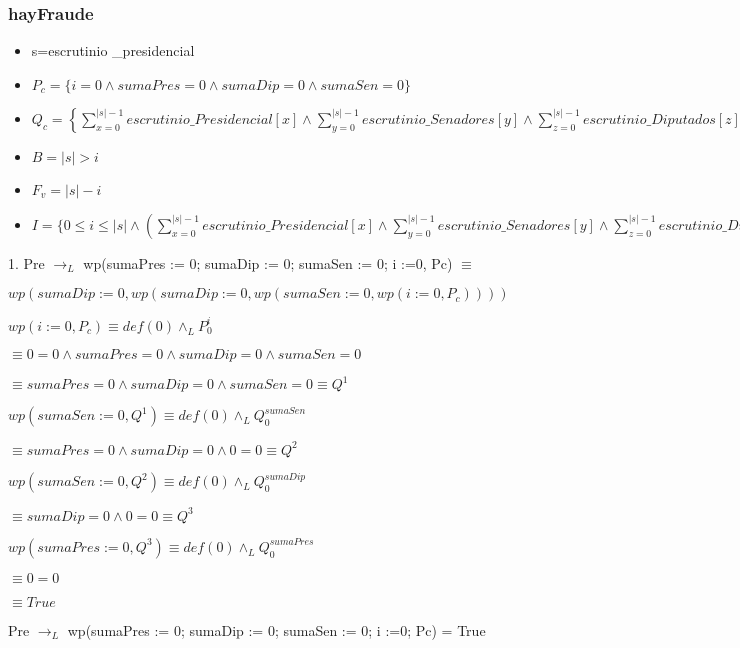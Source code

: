 \documentclass[10pt,a4paper]{article}
\begin{document}
\subsubsection{hayFraude}
\begin{itemize}
	\item s=escrutinio \_presidencial
    \item $P_c = \{ i=0 \land sumaPres=0 \land sumaDip=0 \land sumaSen=0 \}$
	\item $Q_c = \left\{ \sum\limits_{x=0}^{|s| - 1} escrutinio\_Presidencial[x] \land \sum\limits_{y=0}^{|s| - 1} escrutinio\_Senadores[y] \land \sum\limits_{z=0}^{|s| - 1} escrutinio\_Diputados[z] \right\}$
	\item $B = |s| > i$
	\item $F_v = |s| - i$
	\item $I = \{0 \leq i \leq |s| \land (\sum\limits_{x=0}^{|s| - 1} escrutinio\_Presidencial[x] \land \sum\limits_{y=0}^{|s| - 1} escrutinio\_Senadores[y] \land \sum\limits_{z=0}^{|s| - 1} escrutinio\_Diputados[z])\}$
\end{itemize}
\vspace{6mm} 
{1. Pre $\longrightarrow_{L}$ wp(sumaPres := 0; sumaDip := 0; sumaSen := 0; i :=0, Pc) } $ \equiv $
\vspace{3mm} 

$wp(sumaDip := 0, wp(sumaDip := 0, wp(sumaSen := 0, wp(i := 0, P_c)))) $

$wp(i := 0, P_c) \equiv def(0) \land_L  P^i_0$

\quad\quad\quad$ \equiv 0 = 0 \land sumaPres = 0 \land sumaDip = 0 \land sumaSen = 0 $ %

$ \equiv sumaPres = 0 \land sumaDip = 0 \land sumaSen = 0 \equiv Q^1 $  %

$wp(sumaSen := 0, Q^1) \equiv def(0) \land_L Q^{sumaSen}_0 $%

$\equiv sumaPres = 0 \land sumaDip = 0 \land 0 = 0 \equiv Q^2 $  %

$wp(sumaSen := 0, Q^2) \equiv def(0) \land_L Q^{sumaDip}_0 $

$\equiv sumaDip = 0 \land 0 = 0 \equiv Q^3 $  %

$wp(sumaPres := 0, Q^3) \equiv def(0) \land_L Q^{sumaPres}_0 $

$\equiv 0 = 0 $  %

$ \equiv True $ %


\vspace{3mm} 
{Pre $\longrightarrow_{L}$ wp(sumaPres := 0; sumaDip := 0; sumaSen := 0; i :=0; Pc) = True }
\vspace{5mm} 
\end{document}

